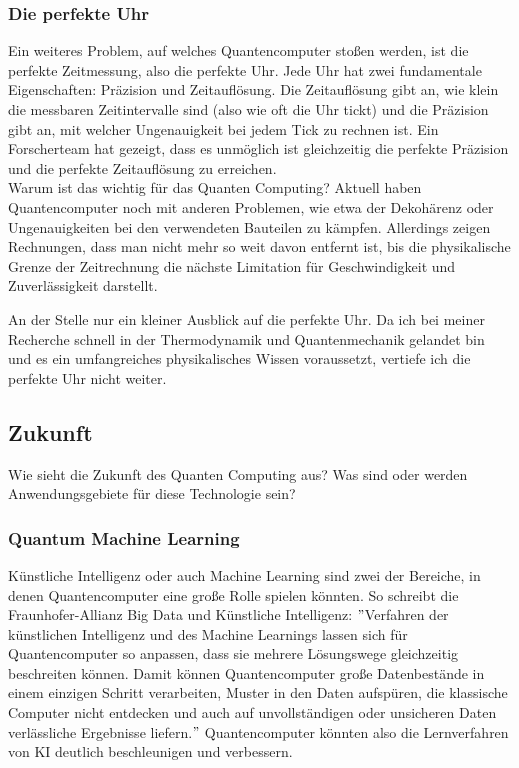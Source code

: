 \subsubsection{Die perfekte Uhr}
\label{subsubsec:die-perfekte-uhr}
Ein weiteres Problem, auf welches Quantencomputer stoßen werden, ist die perfekte Zeitmessung, also die perfekte Uhr.
Jede Uhr hat zwei fundamentale Eigenschaften: Präzision und Zeitauflösung.
Die Zeitauflösung gibt an, wie klein die messbaren Zeitintervalle sind (also wie oft die Uhr tickt) und die Präzision gibt an, mit welcher Ungenauigkeit bei jedem Tick zu rechnen ist.
Ein Forscherteam hat gezeigt, dass es unmöglich ist gleichzeitig die perfekte Präzision und die perfekte Zeitauflösung zu erreichen.\\

Warum ist das wichtig für das Quanten Computing?
Aktuell haben Quantencomputer noch mit anderen Problemen, wie etwa der Dekohärenz oder Ungenauigkeiten bei den verwendeten Bauteilen zu kämpfen.
Allerdings zeigen Rechnungen, dass man nicht mehr so weit davon entfernt ist, bis die physikalische Grenze der Zeitrechnung die nächste Limitation für Geschwindigkeit und Zuverlässigkeit darstellt.\\

\begin{tcolorbox}[title=Kommentar,
    title filled=false,
    colback=cyan!5!white,
    colframe=cyan!75!black]
    An der Stelle nur ein kleiner Ausblick auf die perfekte Uhr.
    Da ich bei meiner Recherche schnell in der Thermodynamik und Quantenmechanik gelandet bin und es ein umfangreiches physikalisches Wissen voraussetzt, vertiefe ich die perfekte Uhr nicht weiter.
\end{tcolorbox}


\subsection{Zukunft}
\label{subsec:zunft}

Wie sieht die Zukunft des Quanten Computing aus?
Was sind oder werden Anwendungsgebiete für diese Technologie sein?\\

\subsubsection{Quantum Machine Learning}
\label{subsubsec:quantum-machine-learning}
Künstliche Intelligenz oder auch Machine Learning sind zwei der Bereiche, in denen Quantencomputer eine große Rolle spielen könnten.
So schreibt die Fraunhofer-Allianz Big Data und Künstliche Intelligenz: \("\)Verfahren der künstlichen Intelligenz und des Machine Learnings lassen sich für Quantencomputer so anpassen, dass sie mehrere Lösungswege gleichzeitig beschreiten können.
Damit können Quantencomputer große Datenbestände in einem einzigen Schritt verarbeiten, Muster in den Daten aufspüren, die klassische Computer nicht entdecken und auch auf unvollständigen oder unsicheren Daten verlässliche Ergebnisse liefern.\("\)
Quantencomputer könnten also die Lernverfahren von KI deutlich beschleunigen und verbessern.\\

